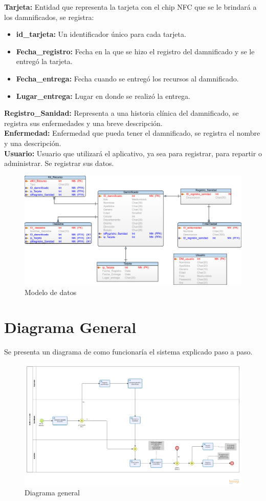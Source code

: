 \documentclass[11pt,openany]{book}
\begin{document}
	\textbf{Tarjeta: }Entidad que representa la tarjeta con el chip NFC que se le brindará a los damnificados, se registra:
	\begin{itemize}
		\item \textbf{id\_tarjeta: }Un identificador único para cada tarjeta.
		\item \textbf{Fecha\_registro: }Fecha en la que se hizo el registro del damnificado y se le entregó la tarjeta.
		\item \textbf{Fecha\_entrega: }Fecha cuando se entregó los recursos al damnificado.
		\item \textbf{Lugar\_entrega: }Lugar en donde se realizó la entrega.
	\end{itemize}
	\textbf{Registro\_Sanidad: }Representa a una historia clínica del damnificado, se registra sus enfermedades y una breve descripción.\\
	\textbf{Enfermedad: }Enfermedad que pueda tener el damnificado, se registra el nombre y una descripción.\\
	\textbf{Usuario: }Usuario que utilizará el aplicativo, ya sea para registrar, para repartir o administrar. Se registrar sus datos.
	\begin{figure}[htbp]
			\centering
			\includegraphics[width=1.1\textwidth]{imagenes/modelo_de_datos.png}
			\caption{Modelo de datos}
			\label{Modelo_de_datos}
	\end{figure}
	\newpage
	\section{Diagrama General}
	Se presenta un diagrama de como funcionaría el sistema explicado paso a paso.
	\begin{figure}[htbp]
			\centering
			\includegraphics[width=1.2\textwidth]{imagenes/Diagrama_general.png}
			\caption{Diagrama general}
			\label{Diagrama_general}
	\end{figure}
\end{document}

